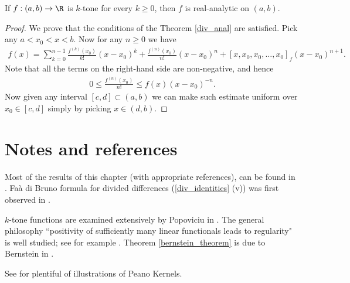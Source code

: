 \begin{lause}\label{bernstein_theorem}
	If $f : (a, b) \to \R$ is $k$-tone for every $k \geq 0$, then $f$ is real-analytic on $(a, b)$.
\end{lause}
\begin{proof}
	We prove that the conditions of the Theorem \ref{div_anal} are satisfied. Pick any $a < x_{0} < x < b$. Now for any $n \geq 0$ we have
	\begin{align*}
		f(x) = \sum_{k = 0}^{n - 1} \frac{f^{(k)}(x_{0})}{k!}(x - x_{0})^{k} + \frac{f^{(n)}(x_{0})}{n!} (x - x_{0})^{n} + [x, x_{0}, x_{0}, \ldots, x_{0}]_{f} (x - x_{0})^{n + 1}.
	\end{align*}
	Note that all the terms on the right-hand side are non-negative, and hence
	\begin{align*}
		0 \leq \frac{f^{(n)}(x_{0})}{n!} \leq f(x) (x - x_{0})^{-n}.
	\end{align*}
	Now given any interval $[c, d] \subset (a, b)$ we can make such estimate uniform over $x_{0} \in [c, d]$ simply by picking $x \in (d, b)$.
\end{proof}

\section{Notes and references}
Most of the results of this chapter (with appropriate references), can be found in \cite{Boo}. Fa\`{a} di Bruno formula for divided differences (\ref{div_identities} (v)) was first observed in \cite{Float}.

$k$-tone functions are examined extensively by Popoviciu in \cite{Popov}. The general philosophy ``positivity of sufficiently many linear functionals leads to regularity" is well studied; see for example \cite{Kemperm}. Theorem \ref{bernstein_theorem} is due to Bernstein in \cite{Bernst}.

See \cite{Boor2} for plentiful of illustrations of Peano Kernels.

